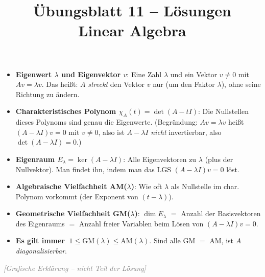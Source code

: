 \documentclass[a4paper,12pt]{article}
\title{\"Ubungsblatt 11 -- L\"osungen \\ \large Linear Algebra}
\author{}
\date{}
\newcommand{\grafik}{\textcolor{gray}{\small\textit{[Grafische Erkl\"arung -- nicht Teil der L\"osung]}}}
\newcommand{\EW}{Eigenwert}
\newcommand{\EV}{Eigenvektor}
\begin{document}
\maketitle

\begin{begriffe}
\begin{itemize}[leftmargin=*, nosep]
    \item \textbf{\EW{} $\lambda$ und \EV{} $v$}: Eine Zahl $\lambda$ und ein Vektor $v \neq 0$ mit $A v = \lambda v$. Das hei\ss t: $A$ \emph{streckt} den Vektor $v$ nur (um den Faktor $\lambda$), ohne seine Richtung zu \"andern.
    \item \textbf{Charakteristisches Polynom $\chi_A(t) = \det(A - t I)$}: Die Nullstellen dieses Polynoms sind genau die \EW{}e. (Begr\"undung: $A v = \lambda v$ hei\ss t $(A - \lambda I) v = 0$ mit $v \neq 0$, also ist $A - \lambda I$ \emph{nicht} invertierbar, also $\det(A - \lambda I) = 0$.)
    \item \textbf{Eigenraum $E_\lambda = \ker(A - \lambda I)$}: Alle \EV{}en zu $\lambda$ (plus der Nullvektor). Man findet ihn, indem man das LGS $(A - \lambda I) v = 0$ l\"ost.
    \item \textbf{Algebraische Vielfachheit AM($\lambda$)}: Wie oft $\lambda$ als Nullstelle im char. Polynom vorkommt (der Exponent von $(t - \lambda)$).
    \item \textbf{Geometrische Vielfachheit GM($\lambda$)}: $\dim E_\lambda$ $=$ Anzahl der Basisvektoren des Eigenraums $=$ Anzahl freier Variablen beim L\"osen von $(A - \lambda I)v = 0$.
    \item \textbf{Es gilt immer} $\;1 \le \text{GM}(\lambda) \le \text{AM}(\lambda)$. Sind alle GM $=$ AM, ist $A$ \emph{diagonalisierbar}.
\end{itemize}
\end{begriffe}

\grafik

\begin{center}
\end{center}
\end{document}
